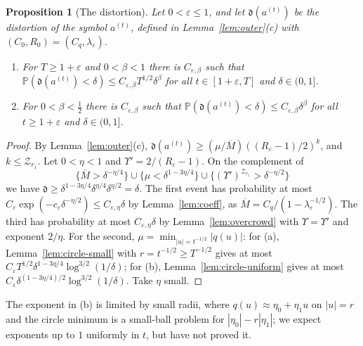 \documentclass[11pt]{amsart}
\newtheorem{proposition}[theorem]{Proposition}
\theoremstyle{definition}
\theoremstyle{remark}
\numberwithin{equation}{section}
\newcommand{\PP}{\mathbb{P}}
\newcommand{\eps}{\varepsilon}
\begin{document}
\begin{proposition}[The distortion]\label{prop:distortion}
Let $0<\eps\le1$, and let $\mathfrak d(a^{(t)})$ be the distortion of the symbol $a^{(t)}$, defined in Lemma~\ref{lem:outer}(c) with $(C_0,R_0)=(C_q,\lambda_\eps)$.
\begin{enumerate}
\item[(a)] For $T\ge1+\eps$ and $0<\beta<1$ there is $C_{\eps,\beta}$ such that $\PP(\mathfrak d(a^{(t)})<\delta)\le C_{\eps,\beta}T^{1/2}\delta^\beta$ for all $t\in[1+\eps,T]$ and $\delta\in(0,1]$.
\item[(b)] For $0<\beta<\frac12$ there is $C_{\eps,\beta}$ such that $\PP(\mathfrak d(a^{(t)})<\delta)\le C_{\eps,\beta}\delta^\beta$ for all $t\ge1+\eps$ and $\delta\in(0,1]$.
\end{enumerate}
\end{proposition}

\begin{proof}
By Lemma~\ref{lem:outer}(c), $\mathfrak d(a^{(t)})\ge(\mu/\overline M)((R_\eps-1)/2)^k$, and $k\le\mathcal Z_{r_1}$. Let $0<\eta<1$ and $\Upsilon'=2/(R_\eps-1)$. On the complement of
\[
\{\overline M>\delta^{-\eta/4}\}\cup\{\mu<\delta^{1-3\eta/4}\}\cup\{(\Upsilon')^{\mathcal Z_{r_1}}>\delta^{-\eta/2}\}
\]
we have $\mathfrak d\ge\delta^{1-3\eta/4}\delta^{\eta/4}\delta^{\eta/2}=\delta$. The first event has probability at most $C_\eps\exp(-c_\eps\delta^{-\eta/2})\le C_{\eps,\eta}\delta$ by Lemma~\ref{lem:coeff}, as $\overline M=C_q/(1-\lambda_\eps^{-1/2})$. The third has probability at most $C_{\eps,\eta}\delta$ by Lemma~\ref{lem:overcrowd} with $\Upsilon=\Upsilon'$ and exponent $2/\eta$. For the second, $\mu=\min_{|u|=t^{-1/2}}|q(u)|$: for (a), Lemma~\ref{lem:circle-small} with $r=t^{-1/2}\ge T^{-1/2}$ gives at most $C_\eps T^{1/2}\delta^{1-3\eta/4}\log^{3/2}(1/\delta)$; for (b), Lemma~\ref{lem:circle-uniform} gives at most $C_\eps\delta^{(1-3\eta/4)/2}\log^{3/2}(1/\delta)$. Take $\eta$ small.
\end{proof}

The exponent in (b) is limited by small radii, where $q(u)\approx\eta_0+\eta_1u$ on $|u|=r$ and the circle minimum is a small-ball problem for $|\eta_0|-r|\eta_1|$; we expect exponents up to $1$ uniformly in $t$, but have not proved it.
\end{document}
